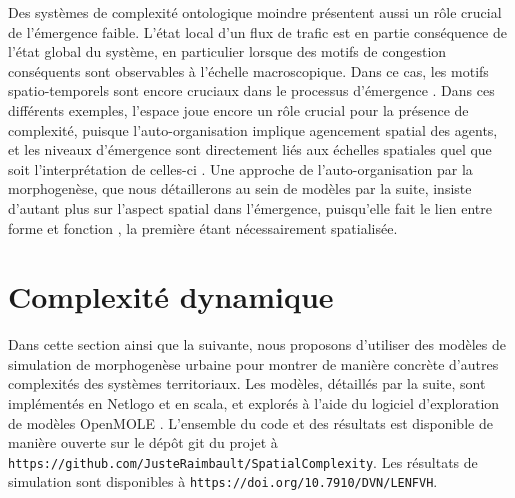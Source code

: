 \documentclass[11pt]{article}
\begin{document}
Des systèmes de complexité ontologique moindre présentent aussi un rôle crucial de l'émergence faible. L'état local d'un flux de trafic est en partie conséquence de l'état global du système, en particulier lorsque des motifs de congestion conséquents sont observables à l'échelle macroscopique. Dans ce cas, les motifs spatio-temporels sont encore cruciaux dans le processus d'émergence \citep{treiber2010three}. Dans ces différents exemples, l'espace joue encore un rôle crucial pour la présence de complexité, puisque l'auto-organisation implique agencement spatial des agents, et les niveaux d'émergence sont directement liés aux échelles spatiales quel que soit l'interprétation de celles-ci \citep{manson2008does}. Une approche de l'auto-organisation par la morphogenèse, que nous détaillerons au sein de modèles par la suite, insiste d'autant plus sur l'aspect spatial dans l'émergence, puisqu'elle fait le lien entre forme et fonction \citep{doursat2012morphogenetic}, la première étant nécessairement spatialisée.






\section{Complexité dynamique}


Dans cette section ainsi que la suivante, nous proposons d'utiliser des modèles de simulation de morphogenèse urbaine pour montrer de manière concrète d'autres complexités des systèmes territoriaux. Les modèles, détaillés par la suite, sont implémentés en Netlogo \citep{wilensky1999netlogo} et en scala, et explorés à l'aide du logiciel d'exploration de modèles OpenMOLE \citep{reuillon2013openmole}. L'ensemble du code et des résultats est disponible de manière ouverte sur le dépôt git du projet à \texttt{https://github.com/JusteRaimbault/SpatialComplexity}. Les résultats de simulation sont disponibles à \texttt{https://doi.org/10.7910/DVN/LENFVH}.


\end{document}
